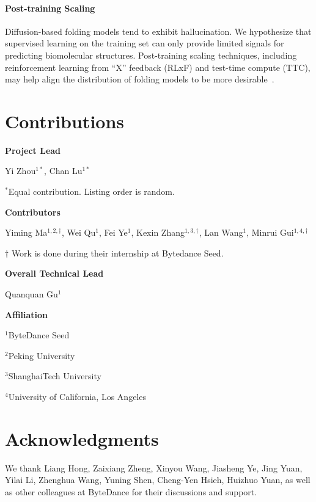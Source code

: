 \documentclass[]{bytedance_seed}
\begin{document}
\paragraph{Post-training Scaling} Diffusion-based folding models tend to exhibit hallucination. We hypothesize that supervised learning on the training set can only provide limited signals for predicting biomolecular structures. Post-training scaling techniques, including reinforcement learning from ``X'' feedback (RLxF) and test-time compute (TTC), may help align the distribution of folding models to be more desirable~\cite{lai2025survey}.


\newpage

\section*{Contributions}

\textbf{Project Lead}

Yi Zhou$^{1*}$, Chan Lu$^{1*}$

$^{*}$Equal contribution. Listing order is random.

\textbf{Contributors}

Yiming Ma$^{1,2,\dagger}$, Wei Qu$^{1}$, Fei Ye$^{1}$, Kexin Zhang$^{1,3,\dagger}$, Lan Wang$^{1}$, Minrui Gui$^{1,4,\dagger}$

$\dagger$ Work is done during their internship at Bytedance Seed.

\textbf{Overall Technical Lead}

Quanquan Gu$^1$

\textbf{Affiliation}

$^1$ByteDance Seed

$^2$Peking University

$^3$ShanghaiTech University

$^4$University of California, Los Angeles

\section*{Acknowledgments}

We thank Liang Hong, Zaixiang Zheng, Xinyou Wang, Jiasheng Ye, Jing Yuan, Yilai Li, Zhenghua Wang, Yuning Shen, Cheng-Yen Hsieh, Huizhuo Yuan, as well as other colleagues at ByteDance for their discussions and support.


\clearpage


% 

\end{document}
